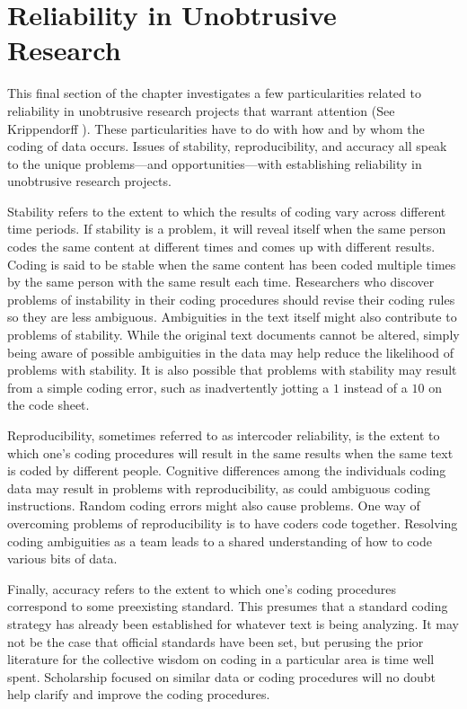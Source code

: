 \section{Reliability in Unobtrusive Research}

This final section of the chapter investigates a few particularities related to reliability in unobtrusive research projects that warrant attention (See Krippendorff \cite{krippendorff2009testing}). These particularities have to do with how and by whom the coding of data occurs. Issues of stability, reproducibility, and accuracy all speak to the unique problems---and opportunities---with establishing reliability in unobtrusive research projects.

Stability refers to the extent to which the results of coding vary across different time periods. If stability is a problem, it will reveal itself when the same person codes the same content at different times and comes up with different results. Coding is said to be stable when the same content has been coded multiple times by the same person with the same result each time. Researchers who discover problems of instability in their coding procedures should revise their coding rules so they are less ambiguous. Ambiguities in the text itself might also contribute to problems of stability. While the original text documents cannot be altered, simply being aware of possible ambiguities in the data may help reduce the likelihood of problems with stability. It is also possible that problems with stability may result from a simple coding error, such as inadvertently jotting a $ 1 $ instead of a $ 10 $ on the code sheet.

Reproducibility, sometimes referred to as intercoder reliability, is the extent to which one's coding procedures will result in the same results when the same text is coded by different people. Cognitive differences among the individuals coding data may result in problems with reproducibility, as could ambiguous coding instructions. Random coding errors might also cause problems. One way of overcoming problems of reproducibility is to have coders code together. Resolving coding ambiguities as a team leads to a shared understanding of how to code various bits of data.

Finally, accuracy refers to the extent to which one's coding procedures correspond to some preexisting standard. This presumes that a standard coding strategy has already been established for whatever text is being analyzing. It may not be the case that official standards have been set, but perusing the prior literature for the collective wisdom on coding in a particular area is time well spent. Scholarship focused on similar data or coding procedures will no doubt help clarify and improve the coding procedures.

